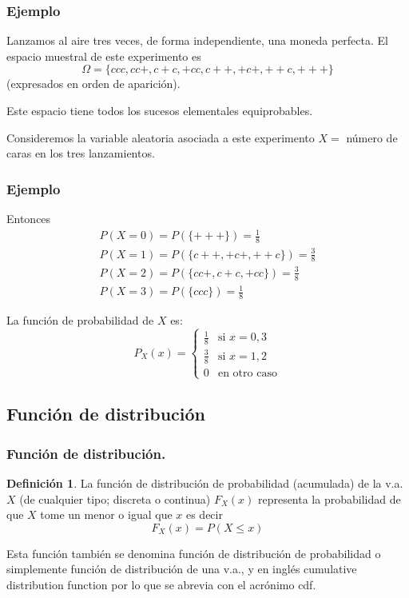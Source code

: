\documentclass[handout]{beamer}\usepackage[]{graphicx}\usepackage[]{color}
\renewcommand{\emph}[1]{{\color{red}#1}}
\renewcommand{\leq}{\leqslant}
\theoremstyle{plain}
\theoremstyle{definition}
\newtheorem{definicion}{Definición}
\begin{document}
\begin{frame}
\frametitle{Ejemplo}
Lanzamos al aire tres veces, de forma independiente, una
moneda perfecta. El espacio muestral de este experimento es
$$\Omega=\{ccc,cc+,c+c,+cc,c++,+c+,++c,+++\}$$ (expresados en orden
de aparición).

Este espacio tiene todos los sucesos elementales
equiprobables. 


Consideremos la variable aleatoria asociada a este experimento $X=$ número de caras en los tres lanzamientos. 
\end{frame}

\begin{frame}
\frametitle{Ejemplo}
Entonces
    $$\begin{array}{l}
P(X=0)=P(\{+++\})=\frac{1}{8}\\ P(X=1)=P(\{c++,+c+,++c\})=\frac{3}{8}\\
    P(X=2)=P(\{cc+,c+c,+cc\})=\frac{3}{8}\\
    P(X=3)=P(\{ccc\})=\frac{1}{8}
    \end{array}$$

    La función de probabilidad de $X$ es:
    $$P_{X}(x)=\left\{\begin{array}{ll} \frac{1}{8} & \mbox{si } x=0,3\\
\frac{3}{8} & \mbox{si } x=1,2\\ 0 & \mbox{en otro caso}\end{array}\right.$$

\end{frame}
\subsection{Función de distribución}

\begin{frame}
\frametitle{Función de distribución.}

\begin{definicion}
La función de \emph{distribución de probabilidad} (acumulada) de la v.a. $X$ (de cualquier tipo;
discreta o continua) $F_{X}(x)$ representa la probabilidad de que $X$  tome un menor o igual que 
 $x$ es decir
$$F_{X}(x)=P(X\leq x)$$
\end{definicion}


Esta función también se denomina función de \emph{distribución de
probabilidad o simplemente función de distribución} de una v.a., y en inglés
\emph{cumulative distribution function} por lo que se abrevia con el acrónimo \emph{cdf}.
\end{frame}
\end{document}
